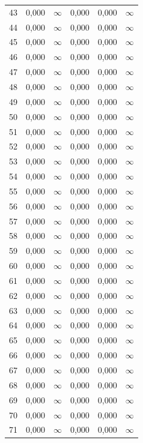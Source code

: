 \begin{tabular}{l c c c c c}
43 & 0,000 & $\infty$ & 0,000 & 0,000 & $\infty$ \\
44 & 0,000 & $\infty$ & 0,000 & 0,000 & $\infty$ \\
45 & 0,000 & $\infty$ & 0,000 & 0,000 & $\infty$ \\
46 & 0,000 & $\infty$ & 0,000 & 0,000 & $\infty$ \\
47 & 0,000 & $\infty$ & 0,000 & 0,000 & $\infty$ \\
48 & 0,000 & $\infty$ & 0,000 & 0,000 & $\infty$ \\
49 & 0,000 & $\infty$ & 0,000 & 0,000 & $\infty$ \\
50 & 0,000 & $\infty$ & 0,000 & 0,000 & $\infty$ \\
51 & 0,000 & $\infty$ & 0,000 & 0,000 & $\infty$ \\
52 & 0,000 & $\infty$ & 0,000 & 0,000 & $\infty$ \\
53 & 0,000 & $\infty$ & 0,000 & 0,000 & $\infty$ \\
54 & 0,000 & $\infty$ & 0,000 & 0,000 & $\infty$ \\
55 & 0,000 & $\infty$ & 0,000 & 0,000 & $\infty$ \\
56 & 0,000 & $\infty$ & 0,000 & 0,000 & $\infty$ \\
57 & 0,000 & $\infty$ & 0,000 & 0,000 & $\infty$ \\
58 & 0,000 & $\infty$ & 0,000 & 0,000 & $\infty$ \\
59 & 0,000 & $\infty$ & 0,000 & 0,000 & $\infty$ \\
60 & 0,000 & $\infty$ & 0,000 & 0,000 & $\infty$ \\
61 & 0,000 & $\infty$ & 0,000 & 0,000 & $\infty$ \\
62 & 0,000 & $\infty$ & 0,000 & 0,000 & $\infty$ \\
63 & 0,000 & $\infty$ & 0,000 & 0,000 & $\infty$ \\
64 & 0,000 & $\infty$ & 0,000 & 0,000 & $\infty$ \\
65 & 0,000 & $\infty$ & 0,000 & 0,000 & $\infty$ \\
66 & 0,000 & $\infty$ & 0,000 & 0,000 & $\infty$ \\
67 & 0,000 & $\infty$ & 0,000 & 0,000 & $\infty$ \\
68 & 0,000 & $\infty$ & 0,000 & 0,000 & $\infty$ \\
69 & 0,000 & $\infty$ & 0,000 & 0,000 & $\infty$ \\
70 & 0,000 & $\infty$ & 0,000 & 0,000 & $\infty$ \\
71 & 0,000 & $\infty$ & 0,000 & 0,000 & $\infty$ \\

\end{tabular}
